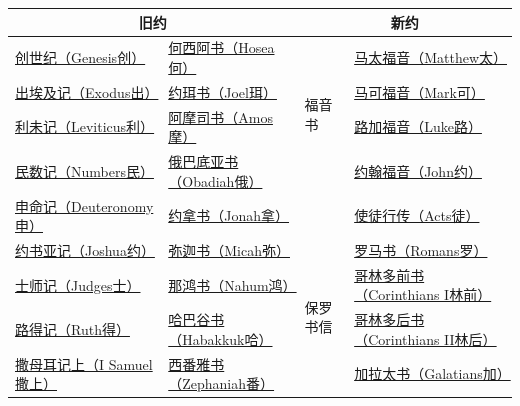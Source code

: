 \documentclass[12pt, a4paper, oneside]{ctexart}
\begin{document}
	\begin{table}[ht]
		\centering
		\tiny
		\begin{tabular}{|l l  | l |l | }
			\hline
			\multicolumn{2}{|c|}{旧约} & \multicolumn{2}{|c|}{新约} \\
			\hline
			\href{https://biblehub.com/bibles/genesis}{创世纪（Genesis创）}  &  \href{https://biblehub.com/bibles/hosea}{何西阿书（Hosea何）}   &\multirow{4}{*}{福音书} & \href{https://biblehub.com/bibles/matthew}{马太福音（Matthew太）}    \\
			\href{https://biblehub.com/bibles/exodus}{出埃及记（Exodus出）}  &  \href{https://biblehub.com/bibles/joel}{约珥书（Joel珥）}     &          & \href{https://biblehub.com/bibles/mark}{马可福音（Mark可）}           \\
			\href{https://biblehub.com/bibles/leviticus}{利未记（Leviticus利）}    &  \href{https://biblehub.com/bibles/amos}{阿摩司书（Amos摩）}    &        & \href{https://biblehub.com/bibles/luke}{路加福音（Luke路）}                      \\
			\href{https://biblehub.com/bibles/numbers}{民数记（Numbers民）}         & \href{https://biblehub.com/bibles/obadiah}{俄巴底亚书（Obadiah俄）}  &      & \href{https://biblehub.com/bibles/john}{约翰福音（John约）}          \\
			\cline{3-4}
			\href{https://biblehub.com/bibles/deuteronomy}{申命记（Deuteronomy申）}     & \href{https://biblehub.com/bibles/jonah}{约拿书（Jonah拿）}    &           & \href{https://biblehub.com/bibles/acts}{使徒行传（Acts徒）}          \\
			\cline{3-4}
			\href{https://biblehub.com/bibles/joshua}{约书亚记（Joshua约）}        & \href{https://biblehub.com/bibles/micah}{弥迦书（Micah弥）}    & \multirow{13}{*}{保罗书信} & \href{https://biblehub.com/bibles/romans}{罗马书（Romans罗）} \\
			\href{https://biblehub.com/bibles/judges}{士师记（Judges士）}          & \href{https://biblehub.com/bibles/nahum}{那鸿书（Nahum鸿）}   &           & \href{https://biblehub.com/bibles/1_corinthians}{哥林多前书（Corinthians I林前）}   \\
			\href{https://biblehub.com/bibles/ruth}{路得记（Ruth得）}            & \href{https://biblehub.com/bibles/habakkuk}{哈巴谷书（Habakkuk哈）}  &          & \href{https://biblehub.com/bibles/2_corinthians}{哥林多后书（Corinthians II林后）}     \\
			\href{https://biblehub.com/bibles/1_samuel}{撒母耳记上（I Samuel撒上）}     & \href{https://biblehub.com/bibles/zephaniah}{西番雅书（Zephaniah番）}  &         & \href{https://biblehub.com/bibles/galatians}{加拉太书（Galatians加）}           \\

\end{tabular}
\end{table}
\end{document}

